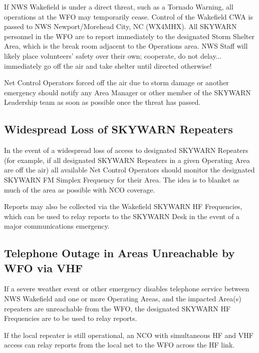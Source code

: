 \documentclass[pdflatex,letterpaper,twoside,12pt]{book}
\begin{document}
If NWS Wakefield is under a direct threat, such as a Tornado Warning, all operations at the WFO may temporarily cease.  Control of the Wakefield CWA is passed to NWS Newport/Morehead City, NC (WX4MHX).  All SKYWARN personnel in the WFO are to report immediately to the designated Storm Shelter Area, which is the break room adjacent to the Operations area.  NWS Staff will likely place volunteers' safety over their own; cooperate, do not delay... immediately go off the air and take shelter until directed otherwise! 


Net Control Operators forced off the air due to storm damage or another emergency should notify any Area Manager or other member of the SKYWARN Leadership team as soon as possible once the threat has passed.

\subsection{Widespread Loss of SKYWARN Repeaters}

In the event of a widespread loss of access to designated SKYWARN Repeaters (for example, if all designated SKYWARN Repeaters in a given Operating Area are off the air) all available Net Control Operators should monitor the designated SKYWARN FM Simplex Frequency for their Area.  The idea is to blanket as much of the area as possible with NCO coverage.

Reports may also be collected via the Wakefield SKYWARN HF Frequencies, which can be used to relay reports to the SKYWARN Desk in the event of a major communications emergency.

\subsection{Telephone Outage in Areas Unreachable by WFO via VHF}

If a severe weather event or other emergency disables telephone service between NWS Wakefield and one or more Operating Areas, and the impacted Area(s) repeaters are unreachable from the WFO, the designated SKYWARN HF Frequencies are to be used to relay reports. 

If the local repeater is still operational, an NCO with simultaneous HF and VHF access can relay reports from the local net to the WFO across the HF link. 
\end{document}
